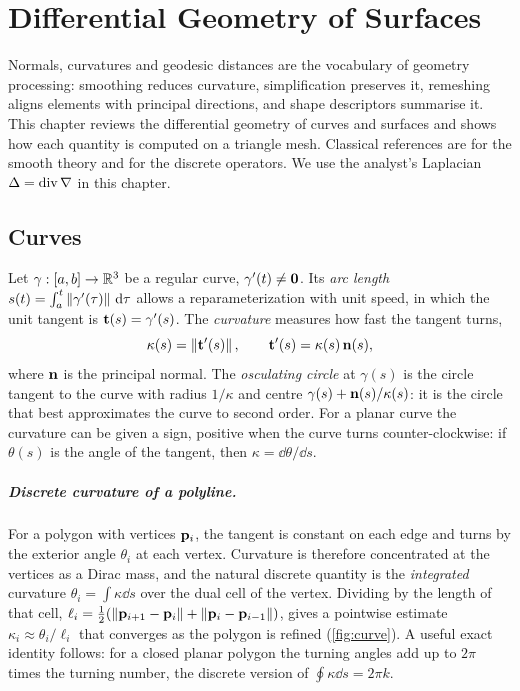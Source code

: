 \chapter{Differential Geometry of Surfaces}\label{ch:diffgeo}

Normals, curvatures and geodesic distances are the vocabulary of geometry processing: smoothing
reduces curvature, simplification preserves it, remeshing aligns elements with principal
directions, and shape descriptors summarise it. This chapter reviews the differential geometry of
curves and surfaces and shows how each quantity is computed on a triangle mesh. Classical
references are \citet{doCarmo1976} for the smooth theory and \citet{Meyer2003,Crane2018} for the
discrete operators. We use the analyst's Laplacian $\Delta=\operatorname{div}\nabla$ in this chapter.

\section{Curves}

Let $\gamma:[a,b]\to\mathbb{R}^3$ be a regular curve, $\gamma'(t)\neq\mathbf{0}$. Its \emph{arc length}
$s(t)=\int_a^t\left\lVert \gamma'(\tau)\right\rVert\,\mathrm{d}\tau$ allows a reparameterization with unit speed, in which
the unit tangent is $\mathbf{t}(s)=\gamma'(s)$. The \emph{curvature} measures how fast the tangent turns,
\begin{equation}
\kappa(s)=\left\lVert \mathbf{t}'(s)\right\rVert,\qquad \mathbf{t}'(s)=\kappa(s)\,\mathbf{n}(s),
\end{equation}
where $\mathbf{n}$ is the principal normal. The \emph{osculating circle} at $\gamma(s)$ is the circle
tangent to the curve with radius $1/\kappa$ and centre $\gamma(s)+\mathbf{n}(s)/\kappa(s)$: it is the
circle that best approximates the curve to second order. For a planar curve the curvature can be
given a sign, positive when the curve turns counter-clockwise: if $\theta(s)$ is the angle of the
tangent, then $\kappa=\dd\theta/\dd s$.

\paragraph{Discrete curvature of a polyline.} For a polygon with vertices $\mathbf{p}_i$, the tangent is
constant on each edge and turns by the exterior angle $\theta_i$ at each vertex. Curvature is
therefore concentrated at the vertices as a Dirac mass, and the natural discrete quantity is
the \emph{integrated} curvature $\theta_i=\int\kappa\dd s$ over the dual cell of the vertex. Dividing
by the length of that cell, $\ell_i=\tfrac12(\left\lVert \mathbf{p}_{i+1}-\mathbf{p}_i\right\rVert+\left\lVert \mathbf{p}_i-\mathbf{p}_{i-1}\right\rVert)$, gives a
pointwise estimate $\kappa_i\approx\theta_i/\ell_i$ that converges as the polygon is refined
(\cref{fig:curve}). A useful exact identity follows: for a closed planar polygon the turning angles
add up to $2\pi$ times the turning number, the discrete version of $\oint\kappa\dd s=2\pi k$.

